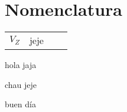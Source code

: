 \documentclass[11pt,a4paper]{article}
\begin{document}
	\pagestyle{pieyencabezado}
	\section*{Nomenclatura}
	
	\begin{tabular}{r l r l}
		$V_Z$ & jeje &&\\
	\end{tabular}
	\begin{multicols}{2}
		\begin{cajita}
			hola jaja
		\end{cajita}
		
		
		\begin{cajita}
			chau jeje
		\end{cajita}
	\end{multicols}

	\begin{cajita}
		buen día
	\end{cajita}
\end{document}

